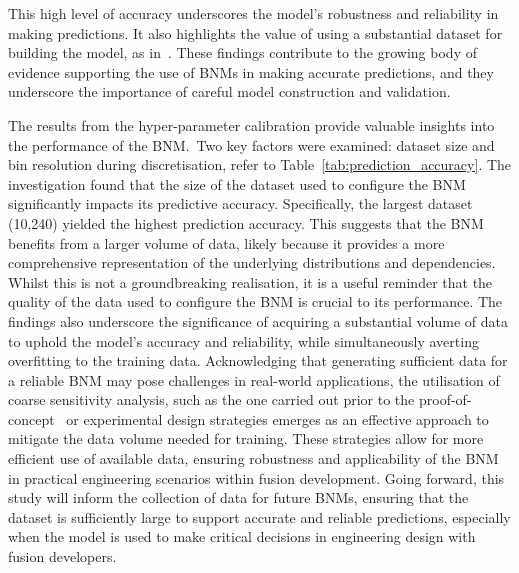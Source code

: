 \documentclass[journal]{IEEEtran}
\begin{document}
This high level of accuracy underscores the model's robustness and reliability in making predictions. It also highlights the value of using a substantial dataset for building the model, as in~\cite{Griffiths2024}. These findings contribute to the growing body of evidence supporting the use of BNMs in making accurate predictions, and they underscore the importance of careful model construction and validation.

The results from the hyper-parameter calibration provide valuable insights into the performance of the BNM.~Two key factors were examined: dataset size and bin resolution during discretisation, refer to Table~\ref{tab:prediction_accuracy}. The investigation found that the size of the dataset used to configure the BNM significantly impacts its predictive accuracy. Specifically, the largest dataset (10,240) yielded the highest prediction accuracy. This suggests that the BNM benefits from a larger volume of data, likely because it provides a more comprehensive representation of the underlying distributions and dependencies. Whilst this is not a groundbreaking realisation, it is a useful reminder that the quality of the data used to configure the BNM is crucial to its performance. The findings also underscore the significance of acquiring a substantial volume of data to uphold the model's accuracy and reliability, while simultaneously averting overfitting to the training data. Acknowledging that generating sufficient data for a reliable BNM may pose challenges in real-world applications, the utilisation of coarse sensitivity analysis, such as the one carried out prior to the proof-of-concept~\cite{Griffiths2024,Hidalgo-Salaverri2023} or experimental design strategies emerges as an effective approach to mitigate the data volume needed for training. These strategies allow for more efficient use of available data, ensuring robustness and applicability of the BNM in practical engineering scenarios within fusion development. Going forward, this study will inform the collection of data for future BNMs, ensuring that the dataset is sufficiently large to support accurate and reliable predictions, especially when the model is used to make critical decisions in engineering design with fusion developers.
\end{document}
